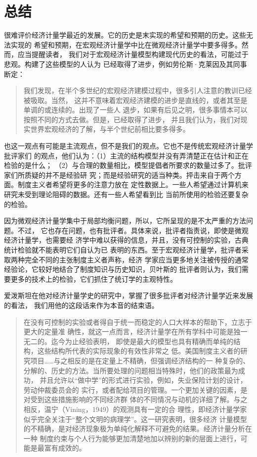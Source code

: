 \section{总结}

很难评价经济计量学最近的发展。它的历史是末实现的希望和预期的历史。这些无法实现的
希望和预期，在宏观经济计量学中比在微观经济计量学中要多得多。然而，应当提醒读者，
我们对于宏观经济计量模型构建现代历史的看法，可能过于悲观。构建了这些模型的人认为
已经取得了进步，例如劳伦斯·克莱因及其同事断定：

\begin{quotation}
  我们发现，在半个多世纪的宏观经济建模过程中，很多引人注意的教训已经被吸取。当然，
  这并不意味着宏观经济建模的进步是直线的，或者其至是单调的或连续的。出现了一些人
  退步，如果有后见之明，很多事情本可以按照不同的方式去做。但是，已经取得了进步，
  并且我们认为，我们对现实世界宏观经济的了解，与半个世纪前相比要多得多。
\end{quotation}

也这一观点有可能是主流观点，但不是我们的观点。它也不是传统宏观经济计量学批评家们
的观点，他们认为：（1）主流的结构模型并没有弄清楚正在估计和正在检验的是什么；
（2）与合理的数量相比，模型提倡者所要求的数量过多了。批评家们所质疑的并不是经验研
究；而是经验研究的适当种类。抨击来自于两个方面。制度主义者希望将更多的注意力放在
定性数据上。一些人希望通过计算机来研究未受到理论阻碍的数据。还有一些人希望看到比
当前所使用的检验还要复杂的检验。

因为微观经济计量学集中于局部均衡问题，所以，它所呈现的是不太严重的方法问题。不过，
它也存在问题，也有批评者。具体来说，批评者指责说，即使是微观经济计量学，也需要经
济学中难以获得的信息，并且，没有可控制的实验，古典统计检验就不能表明它们自认为已
表明的东西。至于宏观经济计量学，批评者采取两种完全不同的主张制度主义者声称，经济
学家应当更多地关注被传授的通常经验论，它较好地结合了制度知识与历史知识，贝叶斯的
批评者则认为，我们需要更多的技术上的检验，它们抓住了统订学的主观特性。

爱泼斯坦在他对经济计量学史的研究中，掌握了很多批评者对经济计量学近来发展的看法，
我们用他的这段话来作为本音的结束语。

\begin{quotation}
  在没有可控制的实验或者得自于统一而稳定的人口大样本的帮助下，立志于更大的定量准
  确性，就这一点而言，经济计量学在所有学科中可能是独一无二的。迄今为止经验表明，
  即使是最大的模型也具有精确而单纯的结构，这些结构所代表的实际现象的有效性非常之
  低。美国制度主义者的研究项目……与之相反的是在定量上不精确，但强调经济结构的一
  种复杂的、分解的、历史的方法。当所要处理的问题相当特殊时，他们的政策最为成功，
  并且允许以“做中学”的形式进行实验，例如，失业保险计划的设计，劳动仲裁委员会的
  实行，或者配给项目的管理。一个更加关键的因素，是对受到这些措施影响的不同经济群
  体的不同情况与动机的详细了解。与之相反，温宁（Vining，1949）的观测具有一定的合
  理性，即经济计量学家似乎完全关注于“整个文明的病理学”。这一研究表明，很多经济
  计量模型的不精确，是对经济现象极为单纯化解释不可避免的结果。经济计量分析在一种
  制度约束与个人行为能够更加清楚地加以辨别的新的层面上进行，可能是最富有成效的。
\end{quotation}

